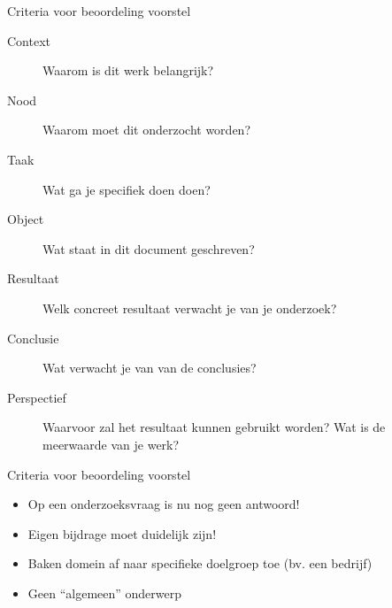 \documentclass[usenames,dvipsnames]{beamer}
\begin{document}
\begin{frame}{Criteria voor beoordeling voorstel}


\begin{description}
  \item[Context] Waarom is dit werk belangrijk?
  \item[Nood] Waarom moet dit onderzocht worden?
  \item[Taak] Wat ga je specifiek doen doen?
  \item[Object] Wat staat in dit document geschreven?
  \item[Resultaat] Welk concreet resultaat verwacht je van je onderzoek?
  \item[Conclusie] Wat verwacht je van van de conclusies?
  \item[Perspectief] Waarvoor zal het resultaat kunnen gebruikt worden? Wat is de meerwaarde van je werk?
\end{description}


\end{frame}

\begin{frame}{Criteria voor beoordeling voorstel}


\begin{itemize}
  \item Op een onderzoeksvraag is nu nog geen antwoord!
  \item Eigen bijdrage moet duidelijk zijn!
  \item Baken domein af naar specifieke doelgroep toe (bv. een bedrijf)
  \item Geen ``algemeen'' onderwerp
\end{itemize}

\end{frame}
\end{document}
